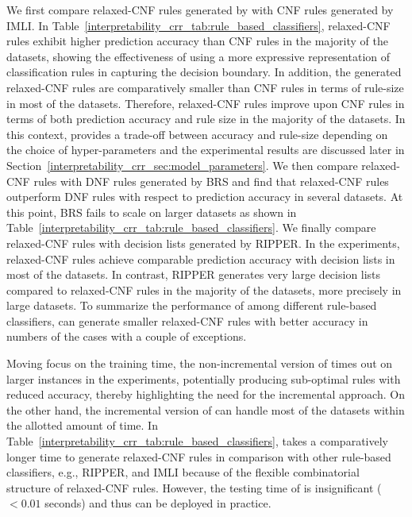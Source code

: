 We first compare relaxed-CNF rules generated by {\crr} with CNF rules generated by IMLI. In {Table}~\ref{interpretability_crr_tab:rule_based_classifiers}, relaxed-CNF rules exhibit higher prediction accuracy than CNF rules in the majority of the datasets, showing the effectiveness of using a more expressive representation of classification rules in capturing the decision boundary. In addition, the generated relaxed-CNF rules are comparatively smaller than CNF rules in terms of rule-size in most of the datasets. Therefore, relaxed-CNF rules improve upon CNF rules in terms of both prediction accuracy and rule size in the majority of the datasets. In this context, {\crr} provides a trade-off between accuracy and rule-size depending on the choice of hyper-parameters and the experimental results are discussed later in Section~\ref{interpretability_crr_sec:model_parameters}.  We then compare relaxed-CNF rules with DNF rules generated by BRS and find that relaxed-CNF rules outperform DNF rules with respect to prediction accuracy in several datasets. At this point,   BRS fails to scale on larger datasets as shown in Table~\ref{interpretability_crr_tab:rule_based_classifiers}. We finally compare relaxed-CNF rules with decision lists generated by RIPPER.  In the experiments, relaxed-CNF rules achieve comparable prediction accuracy with decision lists in most of the datasets. In contrast,   RIPPER generates very large decision lists compared to relaxed-CNF rules in the majority of the datasets, more precisely in large datasets.  To summarize the performance of {\crr} among different rule-based classifiers,  {\crr} can generate smaller relaxed-CNF rules with better accuracy in numbers of the cases with a couple of exceptions. 



Moving focus on the training time,  the non-incremental version of {\crr} times out on larger instances in the experiments, potentially producing sub-optimal rules with reduced accuracy, thereby highlighting the need for the incremental approach. On the other hand, the incremental version of {\crr} can handle most of the datasets within the allotted amount of time. In Table~\ref{interpretability_crr_tab:rule_based_classifiers}, {\crr} takes a comparatively longer time to generate relaxed-CNF rules in comparison with other rule-based classifiers, e.g., RIPPER, and IMLI because of  the flexible combinatorial structure of relaxed-CNF rules. However, the testing time of {\crr} is insignificant ($ < 0.01 $ seconds) and thus can 
 be deployed in practice.  
 

